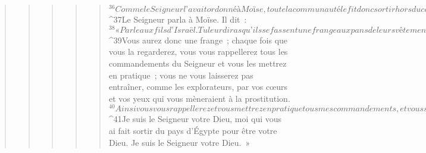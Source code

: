 \begin{verse}
\begin{verse}
\begin{verse}
\begin{verse}
\begin{verse}
${}^{36}Comme le Seigneur l’avait ordonné à Moïse, toute la communauté le fit donc sortir hors du camp, on le lapida et il mourut.
${}^{37}Le Seigneur parla à Moïse. Il dit : 
${}^{38}« Parle aux fils d’Israël. Tu leur diras qu’ils se fassent une frange aux pans de leurs vêtements, et ceci d’âge en âge, et qu’ils placent sur la frange du pan de leur vêtement un cordon de pourpre violette. 
${}^{39}Vous aurez donc une frange ; chaque fois que vous la regarderez, vous vous rappellerez tous les commandements du Seigneur et vous les mettrez en pratique ; vous ne vous laisserez pas entraîner, comme les explorateurs, par vos cœurs et vos yeux qui vous mèneraient à la prostitution. 
${}^{40}Ainsi vous vous rappellerez et vous mettrez en pratique tous mes commandements, et vous serez saints pour votre Dieu. 
${}^{41}Je suis le Seigneur votre Dieu, moi qui vous ai fait sortir du pays d’Égypte pour être votre Dieu. Je suis le Seigneur votre Dieu. »
      

\end{verse}
\end{verse}
\end{verse}
\end{verse}
\end{verse}
